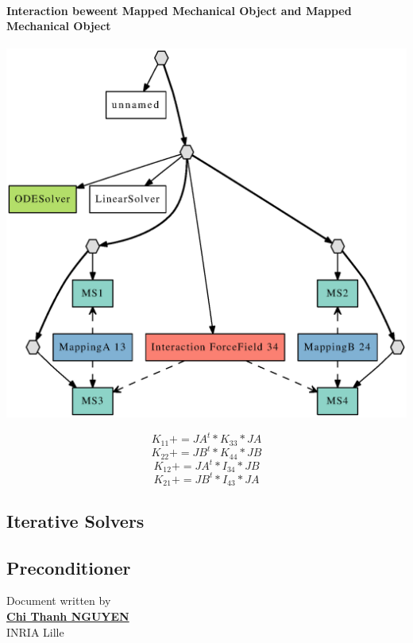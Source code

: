 \documentclass[a4paper,10pt]{article}
\begin{document}
\paragraph{Interaction beweent Mapped Mechanical Object and Mapped Mechanical Object}
\begin{center}
  \includegraphics[scale=0.3]{interaction_Mapped_Mapped}
\end{center}
\[
K_{11} += JA^t * K_{33} * JA 
\]
\[
K_{22} += JB^t * K_{44} * JB 
\]
\[
K_{12} += JA^t * I_{34} * JB 
\]
\[
K_{21} += JB^t * I_{43} * JA 
\]
\subsection{Iterative Solvers }
\subsection{Preconditioner }



						      \begin{flushright}
						      Document written by \\
						      \href{mailto:chi-thanh.nguyen@inria.fr}{{\textbf {Chi Thanh NGUYEN}}} \\
						      INRIA Lille
						      \end{flushright}

%
%
\end{document}

